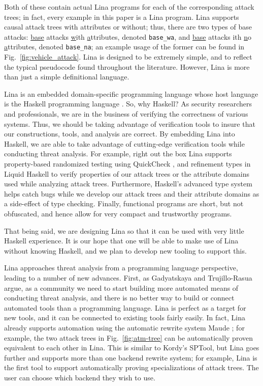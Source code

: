 Both of these contain actual Lina programs for each of the
corresponding attack trees; in fact, every example in this paper is a
Lina program. Lina supports causal attack trees with attributes or
without; thus, there are two types of base attacks: \underline{base}
attacks \underline{w}ith \underline{a}ttributes, denoted
\verb!base_wa!, and \underline{base} attacks ith
\underline{n}o \underline{a}ttributes, denoted \verb!base_na!; an
example usage of the former can be found in
Fig.~\ref{fig:vehicle_attack}.  Lina is designed to be extremely
simple, and to reflect the typical pseudocode found throughout the
literature.  However, Lina is more than just a simple definitional
language.

Lina is an embedded domain-specific programming language whose host
language is the Haskell programming language \cite{jones2003haskell}.
So, why Haskell?  As security researchers and professionals, we are in
the business of verifying the correctness of various systems. Thus, we
should be taking advantage of verification tools to insure that our
constructions, tools, and analysis are correct.  By embedding Lina
into Haskell, we are able to take advantage of cutting-edge
verification tools while conducting threat analysis.  For example,
right out the box Lina supports property-based randomized testing
using QuickCheck \cite{Claessen:2011:QLT:1988042.1988046}, and
refinement types in Liquid Haskell
\cite{Vazou:2014:RTH:2692915.2628161} to verify properties of our
attack trees or the attribute domains used while analyzing attack
trees.  Furthermore, Haskell's advanced type system helps catch bugs
while we develop our attack trees and their attribute domains as a
side-effect of type checking.  Finally, functional programs are short,
but not obfuscated, and hence allow for very compact and trustworthy
programs.

That being said, we are designing Lina so that it can be used with
very little Haskell experience.  It is our hope that one will be able
to make use of Lina without knowing Haskell, and we plan to develop
new tooling to support this.

Lina approaches threat analysis from a programming language
perspective, leading to a number of new advances.  First, as
Gadyatskaya and Trujillo-Rasua \cite{10.1007/978-3-319-74860-3_9}
argue, as a community we need to start building more automated means
of conducting threat analysis, and there is no better way to build or
connect automated tools than a programming language.  Lina is perfect
as a target for new tools, and it can be connected to existing tools
fairly easily.  In fact, Lina already supports automation using the
automatic rewrite system Maude \cite{clavel2005maude}; for example,
the two attack trees in Fig.~\ref{fig:atm-tree} can be automatically
proven equivalent to each other in Lina.  This is similar to Kordy's
\cite{Kordy2017} SPTool, but Lina goes further and supports more than
one backend rewrite system; for example, Lina is the first tool to
support automatically proving specializations of attack trees.  The
user can choose which backend they wish to use.

